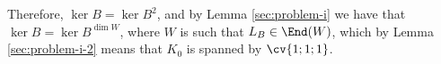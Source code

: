 \documentclass[11pt]{scrartcl}
\begin{document}
\begin{soln}

Therefore, $\ker B = \ker B^2$, and by Lemma \ref{sec:problem-i} we
have that $\ker B = \ker B^{\dim W}$, where $W$ is such that
$L_B \in \End(W)$, which by Lemma \ref{sec:problem-i-2} means that $K_0$ is spanned by $\cv{1;1;1}$.




\end{soln}
\end{document}
